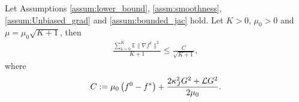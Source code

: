 \documentclass{article}
\begin{document}
\begin{theorem} \label{thm:convergence}%
 Let Assumptions \ref{assum:lower_bound},  \ref{assm:smoothness}, \ref{assum:Unbiased_grad} and \ref{assum:bounded_jac} hold. Let $K>0$, $\mu_0 > 0$ and $\mu =\mu_0 {\sqrt{K+1}}$, then
\begin{eqnarray*}
 \frac{\sum_{k=0}^K \mathbb{E} \|\nabla f^k\|^2}{K+1} \leq \frac{C}{\sqrt{K+1}},
\end{eqnarray*}
where $$C:= \mu_0 \left(f^0 - f^*\right)+\frac{2 \kappa_J^2 G^2 + {\cal L} G^2}{2\mu_0}.$$
\end{theorem}
\end{document}
